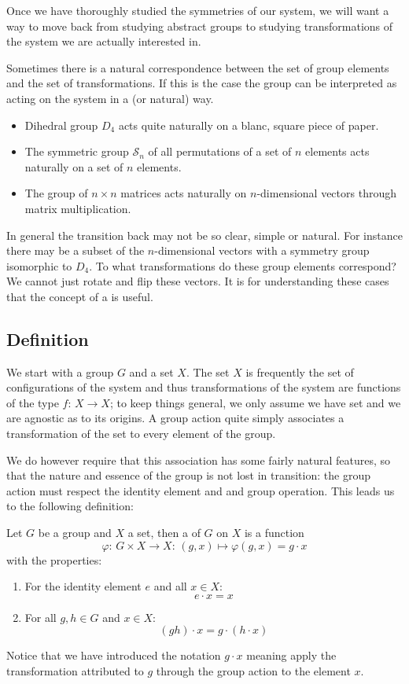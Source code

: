 Once we have thoroughly studied the symmetries of our system, we will want a way to move back from studying abstract groups to studying transformations of the system we are actually interested in.

Sometimes there is a natural correspondence between the set of group elements and the set of transformations. If this is the case the group can be interpreted as acting on the system in a  (or natural) way.

\begin{example}
\begin{itemize}
\item Dihedral group $D_4$ acts quite naturally on a blanc, square piece of paper.
\item The symmetric group $\mathcal{S}_n$ of all permutations of a set of $n$ elements acts naturally on a set of $n$ elements.
\item The group of $n\times n$ matrices acts naturally on $n$-dimensional vectors through matrix multiplication.
\end{itemize}
\end{example}

In general the transition back may not be so clear, simple or natural. For instance there may be a subset of the $n$-dimensional vectors with a symmetry group isomorphic to $D_4$. To what transformations do these group elements correspond? We cannot just rotate and flip these vectors. It is for understanding these cases that the concept of a  is useful.

\subsection{Definition}
We start with a group $G$ and a set $X$. The set $X$ is frequently the set of configurations of the system and thus transformations of the system are functions of the type $f:\,X\to X$; to keep things general, we only assume we have set and we are agnostic as to its origins.
A group action quite simply associates a transformation of the set to every element of the group.

We do however require that this association has some fairly natural features, so that the nature and essence of the group is not lost in transition: the group action must respect the identity element and and group operation. This leads us to the following definition:
\begin{definition}
Let $G$ be a group and $X$ a set, then a  of $G$ on $X$ is a function
\[ \varphi: \, G\times X \to X: \, (g,x)\mapsto \varphi(g,x) = g\cdot x \]
with the properties:
\begin{enumerate}
\item For the identity element $e$ and all $x\in X$: 
\[e\cdot x = x \]
\item For all $g,h \in G$ and $x\in X$:
\[ (gh)\cdot x = g\cdot (h\cdot x) \]
\end{enumerate}
Notice that we have introduced the notation $g\cdot x$ meaning apply the transformation attributed to $g$ through the group action to the element $x$.
\end{definition}


